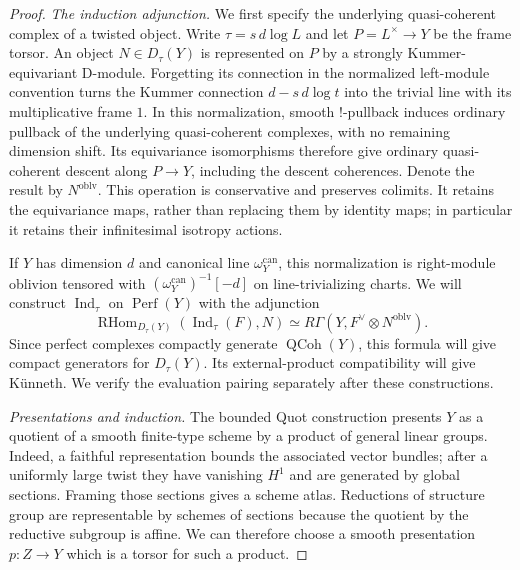 \documentclass[11pt]{article}
\numberwithin{equation}{section}
\theoremstyle{definition}
\theoremstyle{remark}
\begin{document}
\begin{proof}
\emph{The induction adjunction.}
We first specify the underlying quasi-coherent complex of a twisted
object.  Write $\tau=s\,d\log L$ and let $P=L^\times\to Y$ be the frame
torsor.  An object $N\in D_\tau(Y)$ is represented on $P$ by a strongly
Kummer-equivariant D-module.  Forgetting its connection in the normalized
left-module convention turns the Kummer connection
$d-s\,d\log t$ into the trivial line with its multiplicative frame $1$.
In this normalization, smooth $!$-pullback induces ordinary pullback of
the underlying quasi-coherent complexes, with no remaining dimension shift.
Its equivariance isomorphisms therefore give ordinary quasi-coherent
descent along $P\to Y$, including the descent coherences.  Denote the
result by $N^{\mathrm{oblv}}$.  This operation is conservative and
preserves colimits.  It retains the equivariance maps, rather than
replacing them by identity maps; in particular it retains their
infinitesimal isotropy actions.

If $Y$ has dimension $d$ and canonical line $\omega_Y^{\mathrm{can}}$,
this normalization is right-module oblivion tensored with
$(\omega_Y^{\mathrm{can}})^{-1}[-d]$ on line-trivializing charts.
We will construct $\operatorname{Ind}_\tau$ on $\operatorname{Perf}(Y)$
with the adjunction
\begin{equation}\label{foundations:induction-adjunction}
 \operatorname{RHom}_{D_\tau(Y)}
       (\operatorname{Ind}_\tau(F),N)
 \simeq R\Gamma(Y,F^\vee\otimes N^{\mathrm{oblv}}).
\end{equation}
Since perfect complexes compactly generate $\operatorname{QCoh}(Y)$,
this formula will give compact generators for $D_\tau(Y)$.  Its
external-product compatibility will give K\"unneth.  We verify the
evaluation pairing separately after these constructions.

\emph{Presentations and induction.}
The bounded Quot construction presents $Y$ as a quotient of a smooth
finite-type scheme by a product of general linear groups.  Indeed, a
faithful representation bounds the associated vector bundles; after a
uniformly large twist they have vanishing $H^1$ and are generated by
global sections.  Framing those sections gives a scheme atlas.  Reductions
of structure group are representable by schemes of sections because the
quotient by the reductive subgroup is affine.  We can therefore choose
a smooth presentation $p:Z\to Y$ which is a torsor for such a product.


\end{proof}
\end{document}
